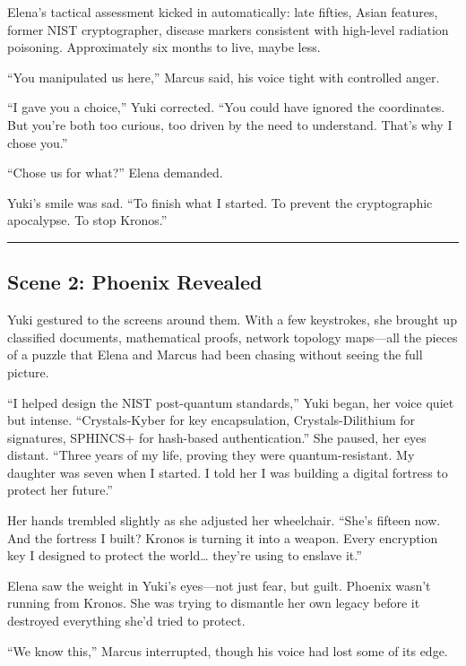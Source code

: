Elena's tactical assessment kicked in automatically: late fifties, Asian features, former NIST cryptographer, disease markers consistent with high-level radiation poisoning. Approximately six months to live, maybe less.

``You manipulated us here,'' Marcus said, his voice tight with controlled anger.

``I gave you a choice,'' Yuki corrected. ``You could have ignored the coordinates. But you're both too curious, too driven by the need to understand. That's why I chose you.''

``Chose us for what?'' Elena demanded.

Yuki's smile was sad. ``To finish what I started. To prevent the cryptographic apocalypse. To stop Kronos.''

\begin{center}\rule{0.5\linewidth}{0.5pt}\end{center}

\hypertarget{scene-2-phoenix-revealed}{%
\subsection{Scene 2: Phoenix Revealed}\label{scene-2-phoenix-revealed}}

Yuki gestured to the screens around them. With a few keystrokes, she brought up classified documents, mathematical proofs, network topology maps---all the pieces of a puzzle that Elena and Marcus had been chasing without seeing the full picture.

``I helped design the NIST post-quantum standards,'' Yuki began, her voice quiet but intense. ``Crystals-Kyber for key encapsulation, Crystals-Dilithium for signatures, SPHINCS+ for hash-based authentication.'' She paused, her eyes distant. ``Three years of my life, proving they were quantum-resistant. My daughter was seven when I started. I told her I was building a digital fortress to protect her future.''

Her hands trembled slightly as she adjusted her wheelchair. ``She's fifteen now. And the fortress I built? Kronos is turning it into a weapon. Every encryption key I designed to protect the world\ldots{} they're using to enslave it.''

Elena saw the weight in Yuki's eyes---not just fear, but guilt. Phoenix wasn't running from Kronos. She was trying to dismantle her own legacy before it destroyed everything she'd tried to protect.

``We know this,'' Marcus interrupted, though his voice had lost some of its edge.

